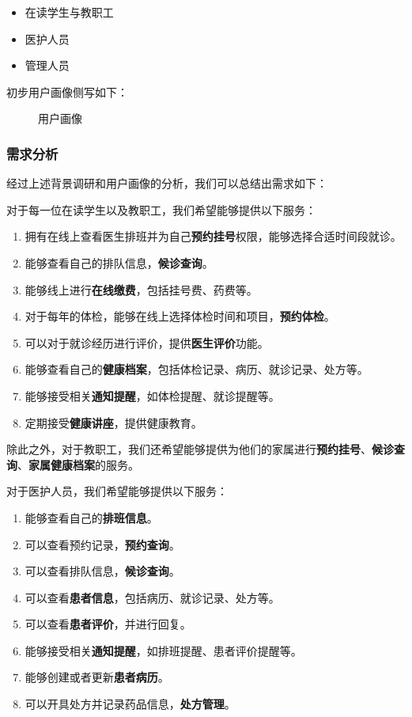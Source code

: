 \documentclass{article}
\begin{document}
\begin{itemize}[itemsep=0.01em]
    \item 在读学生与教职工
    \item 医护人员
    \item 管理人员
\end{itemize}

初步用户画像侧写如下：

\begin{figure}[h]
    \centering
    \caption{用户画像}
\end{figure}

\subsubsection{需求分析}

经过上述背景调研和用户画像的分析，我们可以总结出需求如下：
\vspace{0.5cm}

对于每一位在读学生以及教职工，我们希望能够提供以下服务：
\begin{enumerate}[itemsep=0.01em]
    \item 拥有在线上查看医生排班并为自己\textbf{预约挂号}权限，能够选择合适时间段就诊。
    \item 能够查看自己的排队信息，\textbf{候诊查询}。
    \item 
    能够线上进行\textbf{在线缴费}，包括挂号费、药费等。
    \item 对于每年的体检，能够在线上选择体检时间和项目，\textbf{预约体检}。
    \item 可以对于就诊经历进行评价，提供\textbf{医生评价}功能。
    \item 能够查看自己的\textbf{健康档案}，包括体检记录、病历、就诊记录、处方等。
    \item 能够接受相关\textbf{通知提醒}，如体检提醒、就诊提醒等。
    \item 定期接受\textbf{健康讲座}，提供健康教育。
\end{enumerate}

除此之外，对于教职工，我们还希望能够提供为他们的家属进行\textbf{预约挂号}、\textbf{候诊查询}、\textbf{家属健康档案}的服务。

\vspace{0.5cm}
对于医护人员，我们希望能够提供以下服务：
\begin{enumerate}[itemsep=0.01em]
    \item 能够查看自己的\textbf{排班信息}。
    \item 可以查看预约记录，\textbf{预约查询}。
    \item 可以查看排队信息，\textbf{候诊查询}。
    \item 可以查看\textbf{患者信息}，包括病历、就诊记录、处方等。
    \item 可以查看\textbf{患者评价}，并进行回复。
    \item 能够接受相关\textbf{通知提醒}，如排班提醒、患者评价提醒等。
    \item 能够创建或者更新\textbf{患者病历}。
    \item 可以开具处方并记录药品信息，\textbf{处方管理}。
\end{enumerate}
\end{document}
